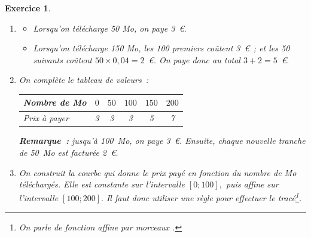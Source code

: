 \documentclass[10pt]{article}
\newtheorem{exo}{Exercice}
\begin{document}
\begin{exo}


\begin{enumerate}
\item \begin{itemize}
\item[\textbullet] Lorsqu'on télécharge 50 Mo, on paye 3~\euro.
\item[\textbullet] Lorsqu'on télécharge 150 Mo, les 100 premiers coûtent 3~\euro~; et les 50 suivants coûtent $50\times 0,04=2$~\euro. On paye donc au total $3+2=5$~\euro.
\end{itemize}

\item On complète le tableau de valeurs~:



\smallskip

\begin{center}
\begin{tabular}{|l|c|c|c|c|c|}
\hline
   Nombre de Mo &$0$ &$50$ &$100$ &$150$ &$200$ \\
	\hline
	Prix à payer &3&3&3&5&7 \\
	\hline
\end{tabular}
\end{center}

\textbf{Remarque~:} jusqu'à 100~Mo, on paye 3~\euro. Ensuite, chaque nouvelle tranche de 50~Mo est facturée 2~\euro.

\item On construit la courbe qui donne le prix payé en fonction du nombre de Mo téléchargés. Elle est constante sur l'intervalle $\left[0;100\right],$ puis affine sur l'intervalle $\left[100;200\right].$ Il faut donc utiliser une règle pour effectuer le tracé\footnote{On parle de fonction \og affine par morceaux \fg.}.


\end{enumerate}
\end{exo}
\end{document}

